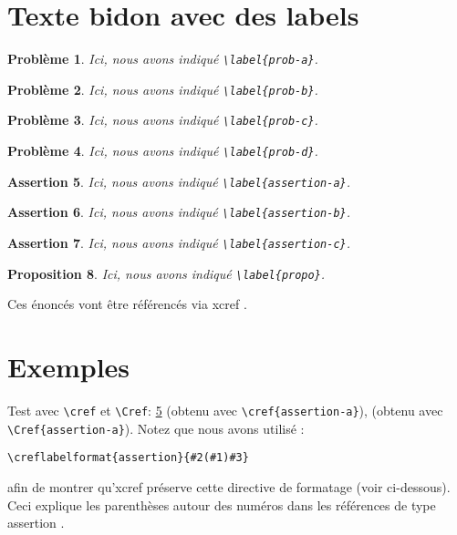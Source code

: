 \documentclass[french]{article}
\newtheorem{problem}{Problème}
\newtheorem{assertion}[problem]{Assertion}
\newtheorem{proposition}[problem]{Proposition}
\let\fxcref=\xcreffrenchwrapper
\begin{document}
\section{Texte bidon avec des labels}

\begin{problem}\label{prob-a}
Ici, nous avons indiqué \verb|\label{prob-a}|.
\end{problem}
\begin{problem}\label{prob-b}
Ici, nous avons indiqué \verb|\label{prob-b}|.
\end{problem}
\begin{problem}\label{prob-c}
Ici, nous avons indiqué \verb|\label{prob-c}|.
\end{problem}
\begin{problem}\label{prob-d}
Ici, nous avons indiqué \verb|\label{prob-d}|.
\end{problem}
\begin{assertion}\label{assertion-a}
Ici, nous avons indiqué \verb|\label{assertion-a}|.
\end{assertion}
\begin{assertion}\label{assertion-b}
Ici, nous avons indiqué \verb|\label{assertion-b}|.
\end{assertion}
\begin{assertion}\label{assertion-c}
Ici, nous avons indiqué \verb|\label{assertion-c}|.
\end{assertion}
\begin{proposition}\label{propo}
Ici, nous avons indiqué \verb|\label{propo}|.
\end{proposition}

Ces énoncés vont être référencés via \textsf{xcref} \fxcref{sec-exemples}.

\section{Exemples}
\label{sec-exemples}

Test avec \verb|\cref| et \verb|\Cref|: \cref{assertion-a} (obtenu avec
\verb|\cref{assertion-a}|),  (obtenu avec
\verb|\Cref{assertion-a}|). Notez que nous avons utilisé :
\begin{verbatim}
\creflabelformat{assertion}{#2(#1)#3}
\end{verbatim}
afin de montrer qu'\textsf{xcref} préserve cette directive de formatage (voir
ci-dessous). Ceci explique les parenthèses autour des numéros dans les
références de type \og assertion \fg.
\end{document}
